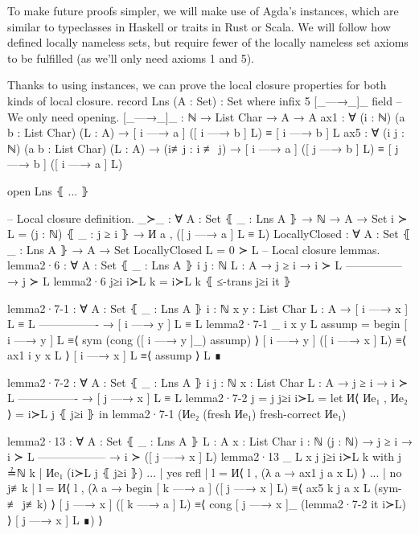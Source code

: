 \documentclass[logo,bsc,singlespacing,parskip,online]{infthesis}
\renewenvironment{code}{\mintedcopy[breaklines,breaksymbolleft=\;]{agda}}{\endmintedcopy}
\begin{document}
To make future proofs simpler, we will make use of Agda's instances, which are similar to
typeclasses in Haskell or traits in Rust or Scala. We will follow how \citet{pitts_locally_2023}
defined locally nameless sets, but require fewer of the locally nameless set axioms to be fulfilled
(as we'll only need axioms 1 and 5).

Thanks to using instances, we can prove the local closure properties for both kinds of local
closure.
\begin{code}
  record Lns (A : Set) : Set where
    infix 5 [_—→_]_
    field
      -- We only need opening.
      [_—→_]_ : ℕ → List Char → A → A
      ax1 : ∀ (i : ℕ) (a b : List Char) (L : A)
        → [ i —→ a ] ([ i —→ b ] L) ≡ [ i —→ b ] L
      ax5 : ∀ (i j : ℕ) (a b : List Char) (L : A)
        → (i≢j : i ≢ j)
        → [ i —→ a ] ([ j —→ b ] L) ≡ [ j —→ b ] ([ i —→ a ] L)

  open Lns ⦃ ... ⦄

  
  -- Local closure definition.
  _≻_ : ∀ {A : Set} ⦃ _ : Lns A ⦄ → ℕ → A → Set
  i ≻ L = (j : ℕ) ⦃ _ : j ≥ i ⦄ → И a , ([ j —→ a ] L ≡ L)
  LocallyClosed : ∀ {A : Set} ⦃ _ : Lns A ⦄ → A → Set
  LocallyClosed L = 0 ≻ L
  -- Local closure lemmas.
  lemma2·6 : ∀ {A : Set} ⦃ _ : Lns A ⦄ {i j : ℕ} {L : A}
    → j ≥ i   → i ≻ L
      ---------------
    → j ≻ L
  lemma2·6 j≥i i≻L k = i≻L k ⦃ ≤-trans j≥i it ⦄

  lemma2·7-1 : ∀ {A : Set} ⦃ _ : Lns A ⦄ {i : ℕ} {x y : List Char} {L : A}
    → [ i —→ x ] L ≡ L
      ----------------
    → [ i —→ y ] L ≡ L
  lemma2·7-1 {_} {i} {x} {y} {L} assump =
    begin
      [ i —→ y ] L
    ≡⟨ sym (cong ([ i —→ y ]_) assump) ⟩
      [ i —→ y ] ([ i —→ x ] L)
    ≡⟨ ax1 i y x L ⟩
      [ i —→ x ] L
    ≡⟨ assump ⟩
      L
    ∎

  lemma2·7-2 : ∀ {A : Set} ⦃ _ : Lns A ⦄ {i j : ℕ} {x : List Char} {L : A}
    → j ≥ i → i ≻ L
      ----------------
    → [ j —→ x ] L ≡ L
  lemma2·7-2 {j = j} j≥i i≻L =
    let И⟨ Иe₁ , Иe₂ ⟩ = i≻L j ⦃ j≥i ⦄ in
      lemma2·7-1 (Иe₂ (fresh Иe₁) {fresh-correct Иe₁})

  lemma2·13 : ∀ {A : Set} ⦃ _ : Lns A ⦄ {L : A} {x : List Char} {i : ℕ} (j : ℕ)
    → j ≥ i      → i ≻ L
      ------------------
    → i ≻ ([ j —→ x ] L)
  lemma2·13 {_} {L} {x} j j≥i i≻L k
    with j ≟ℕ k | Иe₁ (i≻L j ⦃ j≥i ⦄)
  ... | yes refl | l = И⟨ l , (λ a → ax1 j a x L) ⟩
  ... | no  j≢k  | l = И⟨ l , (λ a → 
    begin
      [ k —→ a ] ([ j —→ x ] L)
    ≡⟨ ax5 k j a x L (sym-≢ j≢k) ⟩
      [ j —→ x ] ([ k —→ a ] L)
    ≡⟨ cong [ j —→ x ]_ (lemma2·7-2 it i≻L) ⟩
      [ j —→ x ] L
    ∎) ⟩


\end{code}
\end{document}
